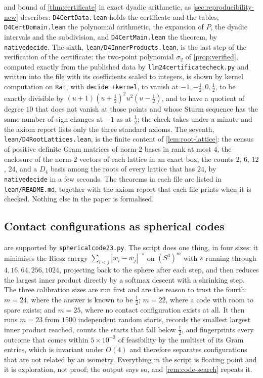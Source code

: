 \documentclass[11pt,reqno]{amsart}
\renewcommand{\_}{\origunderscore\allowbreak}
\numberwithin{equation}{section}
\theoremstyle{plain}
\theoremstyle{definition}
\theoremstyle{remark}
\begin{document}
and bound of \cref{thm:certificate} in exact dyadic arithmetic, as
\cref{sec:reproducibility-new} describes: \texttt{D4CertData.lean} holds
the certificate and the tables, \texttt{D4CertDomain.lean} the
polynomial arithmetic, the expansion of $P$, the dyadic intervals and
the subdivision, and \texttt{D4CertMain.lean} the theorem, by
\texttt{native\_decide}. The sixth, \texttt{lean/D4InnerProducts.lean},
is the last step of the verification of the certificate: the two-point
polynomial $\sigma_2$ of \cref{prop:verified}, computed exactly from the
published data by \texttt{llm24\_certificate\_check.py} and written
into the file with its coefficients scaled to integers, is shown by
kernel computation on \texttt{Rat}, with \texttt{decide +kernel}, to
vanish at $-1,-\tfrac12,0,\tfrac12$, to be exactly divisible by
$(u+1)(u+\tfrac12)^2u^2(u-\tfrac12)$, and to have a quotient of degree
$10$ that does not vanish at those points and whose Sturm sequence has
the same number of sign changes at $-1$ as at $\tfrac12$; the check
takes under a minute and the axiom report lists only the three
standard axioms. The seventh, \texttt{lean/D4RootLattices.lean}, is the
finite content of \cref{lem:root-lattice}: the census of positive
definite Gram matrices of norm-$2$ bases in rank at most $4$, the
enclosure of the norm-$2$ vectors of each lattice in an exact box, the
counts $2$, $6$, $12$, $24$, and a $D_4$ basis among the roots of every
lattice that has $24$, by \texttt{native\_decide} in a few seconds. The theorems in each file are listed in
\texttt{lean/README.md}, together with the axiom report that each file
prints when it is checked. Nothing else in the paper is formalised.

\subsection*{Contact configurations as spherical codes}

 are supported by
\texttt{spherical\_code\_23.py}. The script does one thing, in four
sizes: it minimises the Riesz energy $\sum_{i<j}|w_i-w_j|^{-s}$ on
$(S^3)^m$ with $s$ running through $4,16,64,256,1024$, projecting back
to the sphere after each step, and then reduces the largest inner
product directly by a softmax descent with a shrinking step. The three
calibration sizes are run first and are the reason to trust the fourth:
$m=24$, where the answer is known to be $\tfrac12$; $m=22$, where a code
with room to spare exists; and $m=25$, where no contact configuration
exists at all. It then runs $m=23$ from $1500$ independent random
starts, records the smallest largest inner product reached, counts the
starts that fall below $\tfrac12$, and fingerprints every outcome that
comes within $5\times10^{-3}$ of feasibility by the multiset of its
Gram entries, which is invariant under $O(4)$ and therefore separates
configurations that are not related by an isometry. Everything in the
script is floating point and it is exploration, not proof; the output
says so, and \cref{rem:code-search} repeats it.
\end{document}
